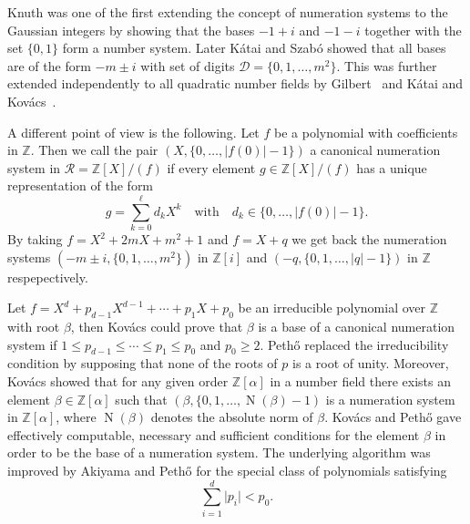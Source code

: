 \documentclass{amsart}
\theoremstyle{plain}
\numberwithin{equation}{section}
\theoremstyle{remark}
\begin{document}
Knuth \cite{knuth1981:art_computer_programming} was one of the first
extending the concept of numeration systems to the Gaussian integers by showing that the bases
$-1+i$ and $-1-i$ together with the set $\{0,1\}$ form a number
system. Later K\'atai and Szab\'o
\cite{katai_szabo1975:canonical_number_systems} showed that all bases
are of the form $-m\pm i$ with set of digits
$\mathcal D=\{0,1,\ldots,m^2\}$. This was further extended independently to all
quadratic number fields by Gilbert~\cite{gilbert81:_radix} and K\'atai
and Kov\'acs~\cite{katai_kovacs1980:kanonische_zahlensysteme_in,
  katai_kovacs1981:canonical_number_systems}.

A different point of view is the following. Let $f$ be a polynomial
with coefficients in ${{\mathbb Z}}$. Then we call the pair $(X,\{0,\ldots,\lvert
f(0)\rvert-1\})$ a canonical numeration system in $\mathcal R={{\mathbb Z}}[X]/(f)$ if every element
$g\in{{\mathbb Z}}[X]/(f)$ has a unique representation of the form
\[g=\sum_{k=0}^\ell d_kX^k
\quad\text{with}\quad
d_k\in\{0,\ldots,\lvert f(0)\rvert-1\}.\]
By taking $f=X^2+2mX+m^2+1$ and $f=X+q$ we get back the numeration systems
$(-m\pm i,\{0,1,\dots,m^2\})$ in ${{\mathbb Z}}[i]$ and $(-q,\{0,1,\dots,|q|-1\})$ in ${{\mathbb Z}}$ respepectively.

Let $f=X^d+p_{d-1}X^{d-1}+\cdots+p_1X+p_0$ be an irreducible polynomial over ${{\mathbb Z}}$ with root $\beta$, 
then Kov\'acs
\cite{kovacs1981:canonical_number_systems} could prove that
$\beta$ is a base of a canonical numeration system if $1\leq p_{d-1}\leq\cdots\leq p_1\leq p_0$ and
$p_0\geq2$. Peth{\H o} \cite{pethoe1991:polynomial_transformation_and}
replaced the irreducibility condition by
supposing that none of the roots of $p$ is a root of unity. Moreover, 
Kov\'acs \cite{kovacs1981:canonical_number_systems} showed that for
any given order ${{\mathbb Z}}[\alpha]$ in a number field there exists an element
$\beta\in{{\mathbb Z}}[\alpha]$ such that $(\beta,\{0,1,\ldots,\operatorname{N}(\beta)-1)$ is a
numeration system in ${{\mathbb Z}}[\alpha]$, where $\operatorname{N}(\beta)$ denotes the absolute norm of $\beta$. Kov\'acs and Peth{\H o}
\cite{kovacs_petho1991:number_systems_in} gave effectively computable,
necessary and sufficient conditions for the element $\beta$ in order
to be the base of a numeration system. The underlying algorithm was
improved by Akiyama and Peth{\H o}
\cite{akiyama_petho2002:canonical_number_systems} for the special
class of polynomials satisfying
\[\sum_{i=1}^d\lvert p_i\rvert<p_0.\]
\end{document}

